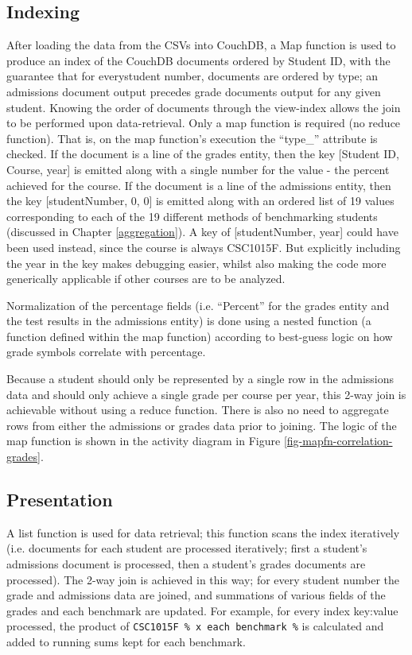 \subsection{Indexing}
After loading the data from the CSVs into CouchDB, a Map function is used to produce an index of the CouchDB documents ordered by Student ID, with the guarantee that for everystudent number, documents are ordered by type; an admissions document output precedes grade documents output for any given student. Knowing the order of documents through the view-index allows the join to be performed upon data-retrieval. Only a map function is required (no reduce function). That is, on the map function’s execution the ``type\_'' attribute is checked. If the document is a line of the grades entity, then the key [Student ID, Course, year] is emitted along with a single number for the value - the percent achieved for the course. If the document is a line of the admissions entity, then the key [studentNumber, 0, 0] is emitted along with an ordered list of 19 values corresponding to each of the 19 different methods of benchmarking students (discussed in Chapter \ref{aggregation}). A key of [studentNumber, year] could have been used instead, since the course is always CSC1015F. But explicitly including the year in the key makes debugging easier, whilst also making the code more generically applicable if other courses are to be analyzed.

Normalization of the percentage fields (i.e. ``Percent'' for the grades entity and the test results in the admissions entity) is done using a nested function (a function defined within the map function) according to best-guess logic on how grade symbols correlate with percentage.

Because a student should only be represented by a single row in the admissions data and should only achieve a single grade per course per year, this 2-way join is achievable without using a reduce function. There is also no need to aggregate rows from either the admissions or grades data prior to joining. The logic of the map function is shown in the activity diagram in Figure \ref{fig-mapfn-correlation-grades}.



\subsection{Presentation}
A list function is used for data retrieval; this function scans the index iteratively (i.e. documents for each student are processed iteratively; first a student's admissions document is processed, then a student's grades documents are processed). The 2-way join is achieved in this way; for every student number the grade and admissions data are joined, and summations of various fields of the grades and each benchmark are updated. For example, for every index key:value processed, the product of \texttt{CSC1015F \% x each benchmark \%} is calculated and added to running sums kept for each benchmark.

